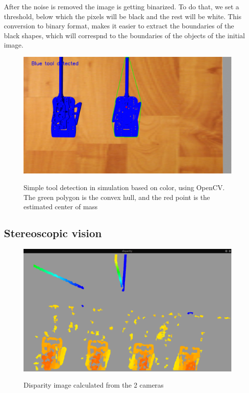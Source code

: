 After the noise is removed the image is getting binarized. To do that, we set a threshold, below which the pixels will be black and the rest will be white. This conversion to binary format, makes it 
easier to extract the boundaries of the black shapes, which will correspnd to the boundaries of the objects of the initial image.

\begin{center}
\begin{figure}[H]
\centering
\includegraphics[width=12cm]{images/opencv-tool-convex-hull.png}\\
\caption{Simple tool detection in simulation based on color, using OpenCV. The green polygon is the convex hull, and the red point is the
estimated center of mass}
\end{figure}
\end{center}

\subsection{Stereoscopic vision}
\label{stereoscopic-vision}

\begin{center}
\begin{figure}[H]
\centering
\includegraphics[width=12cm]{images/disparity.png}\\
\caption{Disparity image calculated from the 2 cameras}
\end{figure}
\end{center}

